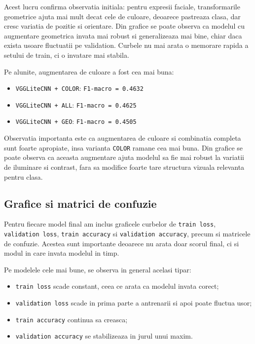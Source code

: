 \documentclass[12pt,a4paper]{article}
\begin{document}
Acest lucru confirma observatia initiala: pentru expresii faciale, transformarile geometrice ajuta mai mult decat cele de culoare, deoarece pastreaza clasa, dar cresc variatia de pozitie si orientare. Din grafice se poate observa ca modelul cu augmentare geometrica invata mai robust si generalizeaza mai bine, chiar daca exista usoare fluctuatii pe validation. Curbele nu mai arata o memorare rapida a setului de train, ci o invatare mai stabila.

Pe alunite, augmentarea de culoare a fost cea mai buna:
\begin{itemize}
    \item \texttt{VGGLiteCNN + COLOR}: \texttt{F1-macro = 0.4632}
    \item \texttt{VGGLiteCNN + ALL}: \texttt{F1-macro = 0.4625}
    \item \texttt{VGGLiteCNN + GEO}: \texttt{F1-macro = 0.4505}
\end{itemize}

Observatia importanta este ca augmentarea de culoare si combinatia completa sunt foarte apropiate, insa varianta \texttt{COLOR} ramane cea mai buna. Din grafice se poate observa ca aceasta augmentare ajuta modelul sa fie mai robust la variatii de iluminare si contrast, fara sa modifice foarte tare structura vizuala relevanta pentru clasa.

\subsection{Grafice si matrici de confuzie}

Pentru fiecare model final am inclus graficele curbelor de \texttt{train loss}, \texttt{validation loss}, \texttt{train accuracy} si \texttt{validation accuracy}, precum si matricele de confuzie. Acestea sunt importante deoarece nu arata doar scorul final, ci si modul in care invata modelul in timp.

Pe modelele cele mai bune, se observa in general acelasi tipar:
\begin{itemize}
    \item \texttt{train loss} scade constant, ceea ce arata ca modelul invata corect;
    \item \texttt{validation loss} scade in prima parte a antrenarii si apoi poate fluctua usor;
    \item \texttt{train accuracy} continua sa creasca;
    \item \texttt{validation accuracy} se stabilizeaza in jurul unui maxim.
\end{itemize}
\end{document}
